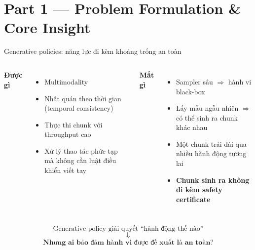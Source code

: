 \documentclass[aspectratio=169]{beamer}
\newcommand{\good}[1]{\textcolor{green!40!black}{#1}}
\newcommand{\bad}[1]{\textcolor{red!60!black}{#1}}
\begin{document}
\section{Part 1 --- Problem Formulation \& Core Insight}
\begin{frame}[t,shrink=8]{Generative policies: năng lực đi kèm khoảng trống an toàn}
\begin{columns}[T]

\textbf{\good{Được gì}}
\begin{itemize}
    \item Multimodality
    \item Nhất quán theo thời gian (temporal consistency)
    \item Thực thi chunk với throughput cao
    \item Xử lý thao tác phức tạp mà không cần luật điều khiển viết tay
\end{itemize}

\textbf{\bad{Mất gì}}
\begin{itemize}
    \item Sampler sâu $\Rightarrow$ hành vi black-box
    \item Lấy mẫu ngẫu nhiên $\Rightarrow$ có thể sinh ra chunk khác nhau
    \item Một chunk trải dài qua nhiều hành động tương lai
    \item \textbf{Chunk sinh ra không đi kèm safety certificate}
\end{itemize}

\end{columns}
\vspace{7pt}
\begin{center}
\Large
\[
\boxed{
\text{Generative policy giải quyết ``hành động thế nào''}
}
\]
\[
\Downarrow
\]
\[
\boxed{
\textbf{Nhưng ai bảo đảm hành vi được đề xuất là an toàn?}
}
\]
\end{center}
\end{frame}
\end{document}
